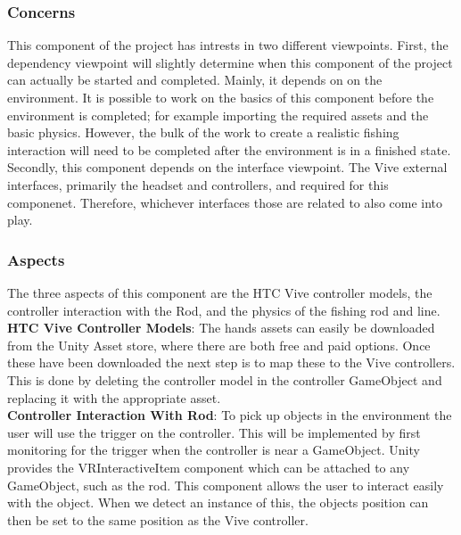 \documentclass[10pt,journal,compsoc,onecolumn, draftclsnofoot]{IEEEtran}
\begin{document}
\subsubsection{Concerns}
This component of the project has intrests in two different viewpoints.
First, the dependency viewpoint will slightly determine when this component of the project can actually be started and completed.
Mainly, it depends on on the environment.
It is possible to work on the basics of this component before the environment is completed; for example importing the required assets and the basic physics.
However, the bulk of the work to create a realistic fishing interaction will need to be completed after the environment is in a finished state.
Secondly, this component depends on the interface viewpoint.
The Vive external interfaces, primarily the headset and controllers, and required for this componenet.
Therefore, whichever interfaces those are related to also come into play.

\subsubsection{Aspects}
The three aspects of this component are the HTC Vive controller models, the controller interaction with the Rod, and the physics of the fishing rod and line.\\

\hangindent=0.5cm \textbf{HTC Vive Controller Models}: The hands assets can easily be downloaded from the Unity Asset store, where there are both free and paid options.
Once these have been downloaded the next step is to map these to the Vive controllers.
This is done by deleting the controller model in the controller GameObject and replacing it with the appropriate asset.\\

\hangindent=0.5cm \textbf{Controller Interaction With Rod}: To pick up objects in the environment the user will use the trigger on the controller.
This will be implemented by first monitoring for the trigger when the controller is near a GameObject.
Unity provides the VRInteractiveItem component which can be attached to any GameObject, such as the rod.\cite{unity_controller_interaction}
This component allows the user to interact easily with the object.
When we detect an instance of this, the objects position can then be set to the same position as the Vive controller.\\
\end{document}
